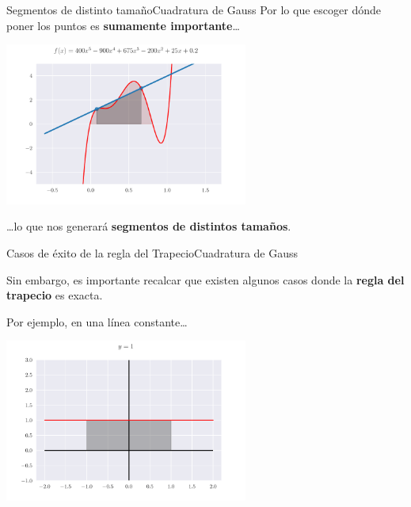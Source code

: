 \documentclass[spanish, c, dvipsnames]{beamer}
\begin{document}
\begin{frame}{Segmentos de distinto tamaño}{Cuadratura de Gauss}
    Por lo que escoger dónde poner los puntos es \textbf{sumamente importante}\dots

    \begin{center}
        \includegraphics[width=0.6\textwidth]{smartposition.pdf}
    \end{center}

    \bigskip

    \dots lo que nos generará \textbf{segmentos de distintos tamaños}.
    
\end{frame}

\begin{frame}{Casos de éxito de la regla del Trapecio}{Cuadratura de Gauss}

    Sin embargo, es importante recalcar que existen algunos casos donde la \textbf{regla del trapecio} \alert{es exacta}.

    Por ejemplo, en una línea constante\dots

    \begin{center}
        \includegraphics[width=0.6\textwidth]{constant1.pdf}
    \end{center}

\end{frame}
\end{document}
